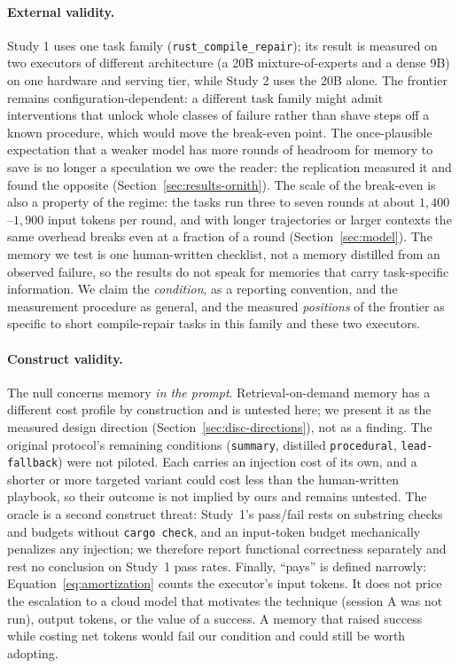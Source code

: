 \documentclass[smallcondensed,natbib]{svjour3}
\begin{document}
\paragraph{External validity.} Study 1 uses one task family
(\texttt{rust\_compile\_repair}); its result is measured on two
executors of different architecture (a 20B mixture-of-experts and a
dense 9B) on one hardware and serving tier, while Study 2 uses the
20B alone. The frontier remains configuration-dependent: a different
task family might admit interventions that unlock whole classes of
failure rather than shave steps off a known procedure, which would
move the break-even point. The once-plausible expectation that a
weaker model has more rounds of headroom for memory to save is no
longer a speculation we owe the reader: the replication measured it
and found the opposite (Section~\ref{sec:results-ornith}). The scale
of the break-even is also a property of the regime: the tasks run three
to seven rounds at about $1{,}400$--$1{,}900$ input tokens per round,
and with longer trajectories or larger contexts the same overhead
breaks even at a fraction of a round (Section~\ref{sec:model}). The
memory we test is one human-written checklist, not a memory distilled
from an observed failure, so the results do not speak for memories
that carry task-specific information. We claim the \emph{condition},
as a reporting convention, and the measurement procedure as general,
and the measured \emph{positions} of the frontier as specific to
short compile-repair tasks in this family and these two executors.

\paragraph{Construct validity.} The null concerns memory \emph{in the
prompt}. Retrieval-on-demand memory has a different cost profile by
construction and is untested here; we present it as the measured
design direction (Section~\ref{sec:disc-directions}), not as a
finding. The original protocol's remaining conditions
(\texttt{summary}, distilled \texttt{procedural},
\texttt{lead-fallback}) were not piloted. Each carries an injection
cost of its own, and a shorter or more targeted variant could cost
less than the human-written playbook, so their outcome is not implied
by ours and remains untested. The oracle is a second construct
threat: Study~1's pass/fail rests on substring checks and budgets
without \texttt{cargo check}, and an input-token budget mechanically
penalizes any injection; we therefore report functional correctness
separately and rest no conclusion on Study~1 pass rates. Finally,
``pays'' is defined narrowly: Equation~\eqref{eq:amortization} counts
the executor's input tokens. It does not price the escalation to a
cloud model that motivates the technique (session A was not run),
output tokens, or the value of a success. A memory that raised
success while costing net tokens would fail our condition and could
still be worth adopting.
\end{document}
